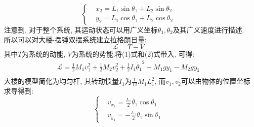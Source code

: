 \documentclass[10.5pt,a4paper]{ctexart}
\begin{document}
\begin{equation}
\left \{ 
  \begin{aligned}
  &x_2 = L_1\sin{\theta_1} + L_2\sin{\theta_2}\\
  &y_2 = L_1\cos{\theta_1} + L_2\cos{\theta_2}
  \end{aligned}
\right.
\end{equation}
注意到, 对于整个系统, 其运动状态可以用广义坐标$\theta_1, \theta_2$及其广义速度进行描述. 
所以可以对大楼-摆锤双摆系统建立拉格朗日量: 
\begin{equation}
  \mathcal{L} = T - V
\end{equation}
其中$T$为系统的动能, $V$为系统的势能.将(1)式和(2)式带入, 可得:
\begin{equation}
\begin{split}
  \mathcal{L} = \frac{1}{2} M_1 v_1^2 + \frac{1}{2} M_2 v_2^2 + \frac{1}{2} I_1 \dot{\theta_1}^2 - M_1 g y_1 - M_2 g y_2\\
\end{split}
\end{equation}
大楼的模型简化为均匀杆, 其转动惯量$I_1$为$\displaystyle\frac{1}{12} M_1 L_1^2$, 而$v_1, v_2$可以由物体的位置坐标求导得到:
\begin{equation}
\left \{ 
  \begin{aligned}
  &v_{x_1} = \frac{L_1}{2}\dot{\theta_1}\cos{\theta_1}\\
  &v_{y_1} = -\frac{L_1}{2}\dot{\theta_1}\sin{\theta_1}
  \end{aligned}
\right.
\end{equation}
\end{document}
